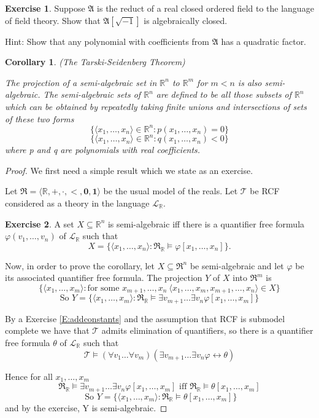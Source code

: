 \documentclass[titlepage, oneside]{amsbook}
\theoremstyle{plain}
\newtheorem{corollary}{Corollary}
\theoremstyle{definition}
\newtheorem{exercise}{Exercise}
\theoremstyle{remark}
\newcommand{\theory}{\ensuremath{\mathcal{T}}}
\newcommand{\lan}{\ensuremath{\mathcal{L}}}
\newcommand{\seq}{\ensuremath{\subseteq}}
\newcommand{\real}{\ensuremath{\mathfrak{R}}}
\newcommand{\reals}{\ensuremath{\mathfrak{R}_{\mathbb{R}}}}
\newcommand{\rea}{\ensuremath{\mathbb{R}}}
\newcommand{\frv}[2][0]{\ensuremath{\forall v_{#1} \dots  \forall   
v_{#2}}}
\newcommand{\exv}[2][0]{\ensuremath{\exists v_{#1}  \dots  \exists
v_{#2}}}
\newcommand{\vnot}[2][0]{\ensuremath{ v_{#1} , \dots , v_{#2}}}
\newcommand{\xnot}[2][0]{\ensuremath{ x_{#1} , \dots , x_{#2}}}
\begin{document}
\begin{exercise}  Suppose $\mathfrak A$ is the reduct of a real closed
ordered  field to the language of field theory.  Show 
that $\mathfrak A [ \sqrt{-1} ] $ is algebraically closed.
 
Hint: Show that any polynomial with coefficients from $\mathfrak A$ has a quadratic factor.
\end{exercise}


\begin{corollary}  (The Tarski-Seidenberg Theorem)

The projection of a semi-algebraic set in $\mathbb{R}^n $ to $\mathbb{R}^m
$ for $m < n$ is also semi-algebraic.  The semi-algebraic sets of
$\mathbb{R}^n $ are defined to be all those subsets of $\mathbb{R}^n$
which can be obtained by repeatedly taking finite unions and intersections
of sets of these two forms 
\[ 
\{ \langle \xnot[1]{n} \rangle \in \mathbb{R}^n : p( \xnot[1]{n} ) =0 \} 
\]
\[  
\{ \langle \xnot[1]{n} \rangle  \in \mathbb{R}^n : q( \xnot[1]{n} ) <0 \} 
\]
where p and q are polynomials with real coefficients.

\end{corollary}

\begin{proof}  We first need a simple result which we state as an exercise. 

Let $\mathfrak{R} = \langle \mathbb R , \pmb{+} , \pmb{\cdot}  ,
\pmb{<}, \mathbf{0}, \mathbf{1} \rangle $ be the usual model of the reals. 
Let $\theory$ be RCF considered as a theory in the language $\lan _{\mathbb{R}}$.

\begin{exercise} A set $X \seq \rea^n$ is semi-algebraic iff there is a
quantifier free formula $\varphi ( \vnot[1]{n} )$ of $\lan _{\mathbb{R}}$  
such that 
\[ X = \{ \langle \xnot[1]{n} \rangle : 
\reals \models \varphi [ \xnot[1]{n} ] \}. \]
\end{exercise}

Now, in order to prove the corollary, let $X \seq \real^n$ be
semi-algebraic and let $\varphi$ be its associated quantifier free
formula. The projection $Y$ of $X$ into $\real^m$ is
 \[ 
 \{ \langle \xnot[1]{m} \rangle : \mbox{for some } \xnot[m+1]{n} \ \langle \xnot[1]{m},
\xnot[m+1]{n} \rangle \in X \} \] 
\[ \mbox{So } Y = \{ \langle \xnot[1]{m} \rangle :
\reals \models \exv[m+1]{n} \varphi [ \xnot[1]{m} ] \}  \]

By a Exercise \ref{E:addconstants} and the assumption that RCF is submodel complete we 
have that $\theory$ admits elimination of quantifiers, so there is a quantifier
free formula $\theta$ of $\lan _{\mathbb{R}} $ such that \[ \theory \models
(\frv[1]{m}) ( \exv[m+1]{n} \varphi \leftrightarrow \theta ) \] 

Hence for all $ \xnot[1]{m} $
\[ \reals \models \exv[m+1]{n} \varphi [ \xnot[1]{m} ] \mbox{ iff  } 
\reals \models \theta [ \xnot[1]{m} ] \] 
\[ \mbox{ So } Y = \{ \langle
\xnot[1]{m} \rangle : \reals \models \theta [\xnot[1]{m} ] \} \] 
and by the exercise, Y is semi-algebraic. 

\end{proof}
\end{document}
